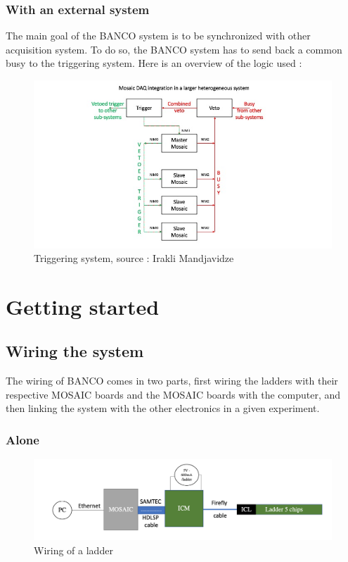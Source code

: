 \documentclass[12pt,oneside,a4]{article}
\begin{document}
\subsubsection{With an external system}
The main goal of the BANCO system is to be synchronized with other acquisition system. To do so, the BANCO system has to send back a common busy to the triggering system. Here is an overview of the logic used :
\begin{figure}[h]
\hspace*{-2cm}
        \centering
        \includegraphics[scale =0.8]{figures/Triggering.jpeg}
        \caption{Triggering system, source : Irakli Mandjavidze}
        \label{fig:8}
\end{figure}


\newpage
\section{Getting started}
    \subsection{Wiring the system}
The wiring of BANCO comes in two parts, first wiring the ladders with their respective MOSAIC boards and the MOSAIC boards with the computer, and then linking the system with the other electronics in a given experiment.
        \subsubsection{Alone}
        \begin{figure}[h]
        \centering
        \includegraphics[scale =0.5]{figures/Wiring_ladder.png}
        \caption{Wiring of a ladder}
        \label{fig:6}
    \end{figure}
    
\end{document}
